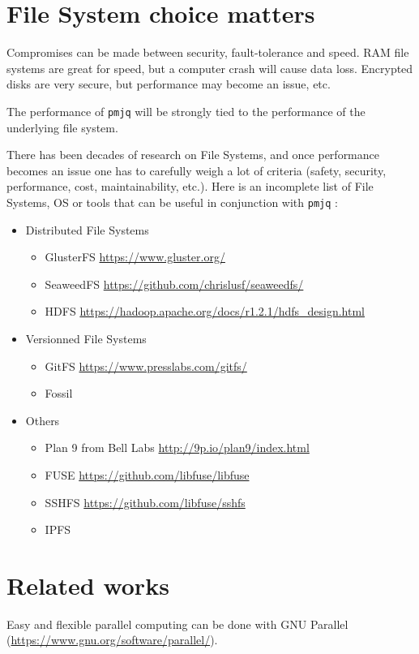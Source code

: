 \documentclass[letterpaper,twocolumn,10pt]{article}
\begin{document}
\section{File System choice matters}
\label{sec:fs}
Compromises can be made between security, fault-tolerance and speed. RAM file systems are great for speed, but a computer crash will cause data loss. Encrypted disks are very secure, but performance may become an issue, etc.

The performance of {\tt pmjq} will be strongly tied to the performance of the underlying file system.

There has been decades of research on File Systems, and once performance becomes an issue one has to carefully weigh a lot of criteria (safety, security, performance, cost, maintainability, etc.). Here is an incomplete list of File Systems, OS or tools that can be useful in conjunction with {\tt pmjq} :
\begin{itemize}
\item Distributed File Systems
  \begin{itemize}
  \item GlusterFS \url{https://www.gluster.org/}
  \item SeaweedFS \url{https://github.com/chrislusf/seaweedfs/}
  \item HDFS \url{https://hadoop.apache.org/docs/r1.2.1/hdfs_design.html}
  \end{itemize}
\item Versionned File Systems
  \begin{itemize}
  \item GitFS \url{https://www.presslabs.com/gitfs/}
  \item Fossil~\cite{fossil}
  \end{itemize}
\item Others
  \begin{itemize}
  \item Plan 9 from Bell Labs \url{http://9p.io/plan9/index.html}
  \item FUSE \url{https://github.com/libfuse/libfuse}
  \item SSHFS \url{https://github.com/libfuse/sshfs}
  \item IPFS~\cite{ipfs}
  \end{itemize}
\end{itemize}

\section{Related works}
Easy and flexible parallel computing can be done with GNU Parallel (\url{https://www.gnu.org/software/parallel/}). 
\end{document}
